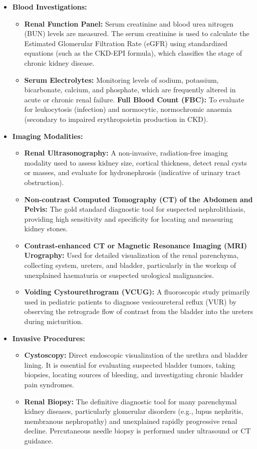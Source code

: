 \begin{itemize}
    \item \textbf{Blood Investigations:}
    \begin{itemize}
        \item \textbf{Renal Function Panel:} Serum creatinine and blood urea nitrogen (BUN) levels are measured. The serum creatinine is used to calculate the Estimated Glomerular Filtration Rate (eGFR) using standardized equations (such as the CKD-EPI formula), which classifies the stage of chronic kidney disease.
        \item \textbf{Serum Electrolytes:} Monitoring levels of sodium, potassium, bicarbonate, calcium, and phosphate, which are frequently altered in acute or chronic renal failure.
        \textbf{Full Blood Count (FBC):} To evaluate for leukocytosis (infection) and normocytic, normochromic anaemia (secondary to impaired erythropoietin production in CKD).
    \end{itemize}
    \item \textbf{Imaging Modalities:}
    \begin{itemize}
        \item \textbf{Renal Ultrasonography:} A non-invasive, radiation-free imaging modality used to assess kidney size, cortical thickness, detect renal cysts or masses, and evaluate for hydronephrosis (indicative of urinary tract obstruction).
        \item \textbf{Non-contrast Computed Tomography (CT) of the Abdomen and Pelvis:} The gold standard diagnostic tool for suspected nephrolithiasis, providing high sensitivity and specificity for locating and measuring kidney stones.
        \item \textbf{Contrast-enhanced CT or Magnetic Resonance Imaging (MRI) Urography:} Used for detailed visualization of the renal parenchyma, collecting system, ureters, and bladder, particularly in the workup of unexplained haematuria or suspected urological malignancies.
        \item \textbf{Voiding Cystourethrogram (VCUG):} A fluoroscopic study primarily used in pediatric patients to diagnose vesicoureteral reflux (VUR) by observing the retrograde flow of contrast from the bladder into the ureters during micturition.
    \end{itemize}
    \item \textbf{Invasive Procedures:}
    \begin{itemize}
        \item \textbf{Cystoscopy:} Direct endoscopic visualization of the urethra and bladder lining. It is essential for evaluating suspected bladder tumors, taking biopsies, locating sources of bleeding, and investigating chronic bladder pain syndromes.
        \item \textbf{Renal Biopsy:} The definitive diagnostic tool for many parenchymal kidney diseases, particularly glomerular disorders (e.g., lupus nephritis, membranous nephropathy) and unexplained rapidly progressive renal decline. Percutaneous needle biopsy is performed under ultrasound or CT guidance.
    \end{itemize}
\end{itemize}

